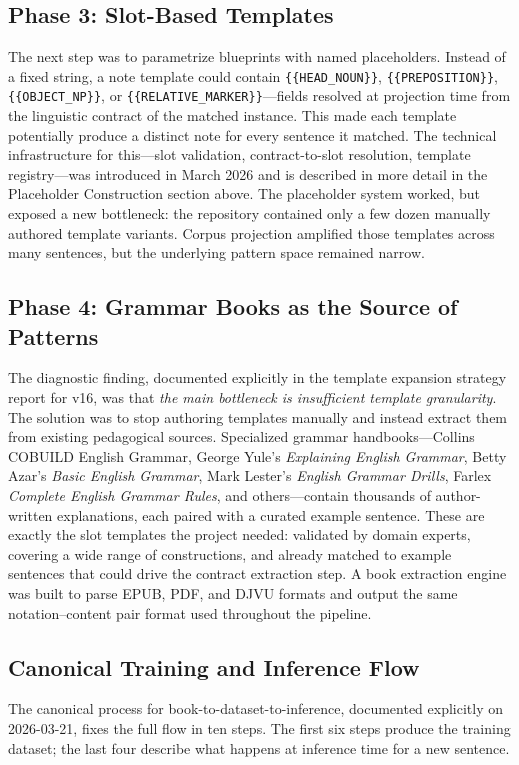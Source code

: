 \documentclass[12pt,a4paper,oneside]{report}
\begin{document}
\subsection*{Phase 3: Slot-Based Templates}
The next step was to parametrize blueprints with named placeholders. Instead of a fixed string, a note template could contain \texttt{\{\{HEAD\_NOUN\}\}}, \texttt{\{\{PREPOSITION\}\}}, \texttt{\{\{OBJECT\_NP\}\}}, or \texttt{\{\{RELATIVE\_MARKER\}\}}---fields resolved at projection time from the linguistic contract of the matched instance. This made each template potentially produce a distinct note for every sentence it matched. The technical infrastructure for this---slot validation, contract-to-slot resolution, template registry---was introduced in March 2026 and is described in more detail in the Placeholder Construction section above. The placeholder system worked, but exposed a new bottleneck: the repository contained only a few dozen manually authored template variants. Corpus projection amplified those templates across many sentences, but the underlying pattern space remained narrow.

\subsection*{Phase 4: Grammar Books as the Source of Patterns}
The diagnostic finding, documented explicitly in the template expansion strategy report for v16, was that \emph{the main bottleneck is insufficient template granularity}. The solution was to stop authoring templates manually and instead extract them from existing pedagogical sources. Specialized grammar handbooks---Collins COBUILD English Grammar, George Yule's \emph{Explaining English Grammar}, Betty Azar's \emph{Basic English Grammar}, Mark Lester's \emph{English Grammar Drills}, Farlex \emph{Complete English Grammar Rules}, and others---contain thousands of author-written explanations, each paired with a curated example sentence. These are exactly the slot templates the project needed: validated by domain experts, covering a wide range of constructions, and already matched to example sentences that could drive the contract extraction step. A book extraction engine was built to parse EPUB, PDF, and DJVU formats and output the same notation--content pair format used throughout the pipeline.

\subsection*{Canonical Training and Inference Flow}
The canonical process for book-to-dataset-to-inference, documented explicitly on 2026-03-21, fixes the full flow in ten steps. The first six steps produce the training dataset; the last four describe what happens at inference time for a new sentence.
\end{document}
